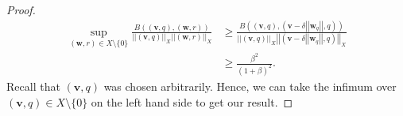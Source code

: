 \documentclass[12pt,a4paper]{article}
\theoremstyle{definition}
\begin{document}
\begin{proof}
\begin{equation}
\begin{aligned}\nonumber
\sup_{\left(\textbf{w},r\right) \in X\setminus \lbrace0\rbrace}\frac{B\left(\left(\textbf{v},q\right),\left(\textbf{w},r\right)\right)}{\left|\left|\left(\textbf{v},q\right)\right|\right|_X\left|\left|\left(\textbf{w},r\right)\right|\right|_X}&\geq \frac{B\left(\left(\textbf{v},q\right),\left(\textbf{v}-\delta\left|\left|\textbf{w}_q\right|\right|,q\right)\right)}{\left|\left|\left(\textbf{v},q\right)\right|\right|_X\left|\left|\left(\textbf{v}-\delta\left|\left|\textbf{w}_q\right|\right|,q\right)\right|\right|_X}\\
&\geq \frac{\beta^2}{\left(1+\beta\right)^2}.
\end{aligned}
\end{equation}
Recall that $\left(\textbf{v},q\right)$ was chosen arbitrarily.  Hence, we can take the infimum over $\left(\textbf{v},q\right)\in X\setminus\lbrace 0 \rbrace$ on the left hand side to get our result. 
\end{proof}
\end{document}
